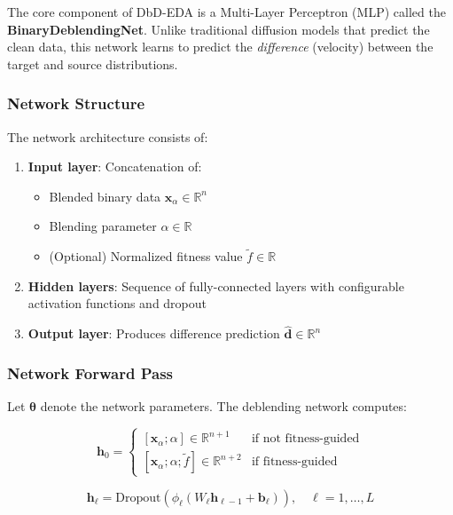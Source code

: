\documentclass[11pt,a4paper]{article}
\newcommand{\R}{\mathbb{R}}
\newcommand{\vx}{\mathbf{x}}
\newcommand{\vtheta}{\boldsymbol{\theta}}
\begin{document}
The core component of DbD-EDA is a Multi-Layer Perceptron (MLP) called the \textbf{BinaryDeblendingNet}. Unlike traditional diffusion models that predict the clean data, this network learns to predict the \emph{difference} (velocity) between the target and source distributions.

\subsubsection{Network Structure}

The network architecture consists of:
\begin{enumerate}
    \item \textbf{Input layer}: Concatenation of:
        \begin{itemize}
            \item Blended binary data $\vx_\alpha \in \R^n$
            \item Blending parameter $\alpha \in \R$
            \item (Optional) Normalized fitness value $\tilde{f} \in \R$
        \end{itemize}
    \item \textbf{Hidden layers}: Sequence of fully-connected layers with configurable activation functions and dropout
    \item \textbf{Output layer}: Produces difference prediction $\hat{\mathbf{d}} \in \R^n$
\end{enumerate}

\subsubsection{Network Forward Pass}

Let $\vtheta$ denote the network parameters. The deblending network computes:

\begin{equation}
    \mathbf{h}_0 = \begin{cases}
        [\vx_\alpha; \alpha] \in \R^{n+1} & \text{if not fitness-guided} \\
        [\vx_\alpha; \alpha; \tilde{f}] \in \R^{n+2} & \text{if fitness-guided}
    \end{cases}
\end{equation}

\begin{equation}
    \mathbf{h}_\ell = \text{Dropout}\left(\phi_\ell\left(W_\ell \mathbf{h}_{\ell-1} + \mathbf{b}_\ell\right)\right), \quad \ell = 1, \ldots, L
\end{equation}
\end{document}
